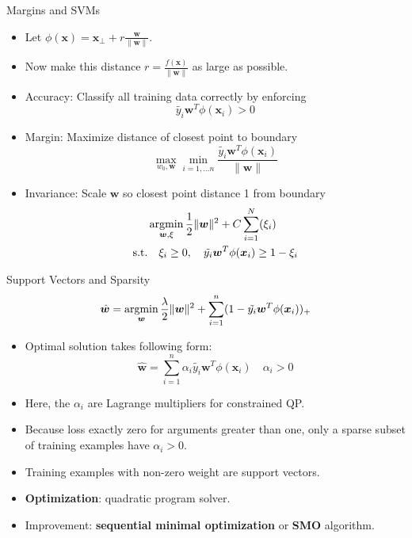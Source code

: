 \documentclass[10pt,mathserif]{beamer}
\begin{document}
\begin{frame}{Margins and SVMs}
\begin{itemize}
    \item Let $\phi(\bm{x}) = \bm{x}_\perp + r\frac{\bm{w}}{\|\bm{w}\|}$.
    \item Now make this distance $r = \frac{f(\bm{x})}{\|\bm{w}\|}$ as large as possible. 
    \item Accuracy: Classify all training data correctly by enforcing
    \begin{equation*}
        \tilde{y_i} \bm{w}^T\phi(\bm{x}_i) > 0
    \end{equation*}
    \item Margin: Maximize distance of closest point to boundary 
    \begin{equation*}
        \max_{w_0,\bm{w}}\min_{i=1,\ldots n}\frac{\tilde{y_i} \bm{w}^T\phi(\bm{x}_i)}{\|\bm{w}\|}
    \end{equation*}
    \item Invariance: Scale $\bm{w}$ so closest point distance 1 from boundary 
    \begin{equation*}
        \begin{split}
            & \mathop{\rm argmin}_{\bm{w},\xi} \frac{1}{2}\|\bm{w}\|^2 + C\sum_{i=1}^N (\xi_i)\\
            \text{s.t.} & \quad \xi_i\geq 0, \quad \tilde{y_i} \bm{w}^T\phi(\bm{x}_i)\geq 1-\xi_i
        \end{split}
    \end{equation*}
\end{itemize}
\end{frame}

\begin{frame}{Support Vectors and Sparsity}
\begin{equation*}
    \hat{\bm{w}} = \mathop{\rm argmin}_{\bm{w}} \frac{\lambda}{2}\|\bm{w}\|^2 + \sum_{i=1}^n (1-\tilde{y_i} \bm{w}^T\phi(\bm{x}_i))_+
\end{equation*}
\begin{itemize}
    \item Optimal solution takes following form:
    \begin{equation*}
        \hat{\bm{w}} = \sum_{i=1}^n \alpha_i \tilde{y_i} \bm{w}^T\phi(\bm{x}_i)\quad\alpha_i>0
    \end{equation*}
    \item Here, the $\alpha_i$ are Lagrange multipliers for constrained QP.
    \item Because loss exactly zero for arguments greater than one, only a sparse subset of training examples have $\alpha_i>0$.
    \item Training examples with non-zero weight are support vectors.
    \item \textbf{Optimization}: quadratic program solver.
    \item Improvement: \textbf{sequential minimal optimization} or \textbf{SMO} algorithm.
\end{itemize}
\end{frame}
\end{document}

